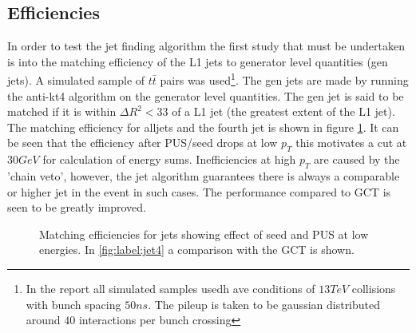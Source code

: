\subsection{Efficiencies}
In order to test the jet finding algorithm the first study that must be undertaken is into the matching efficiency of the L1 jets to generator level quantities (gen jets). A simulated sample of $t\bar{t}$ pairs was used\footnote{In the report all simulated samples usedh ave conditions of $13TeV$ collisions with bunch spacing $50ns$. The pileup is taken to be gaussian distributed around $40$ interactions per bunch crossing}. The gen jets are made by running the anti-kt4 algorithm on the generator level quantities. The gen jet is said to be matched if it is within ${\Delta R}^2<33$ of a L1 jet (the greatest extent of the L1 jet). The matching efficiency for alljets and the fourth jet is shown in figure \ref{match}. It can be seen that the efficiency after PUS/seed drops at low $p_T$ this motivates a cut at $30GeV$ for calculation of energy sums. Inefficiencies at high $p_T$ are caused by the 'chain veto', however, the jet algorithm guarantees there is always a comparable or higher jet in the event in such cases. The performance compared to GCT is seen to be greatly improved.  
\begin{figure}
\hfill
{}
\hfill
{}
\hfill
\caption{Matching efficiencies for jets showing effect of seed and PUS at low energies. In \ref{fig:label:jet4} a comparison with the GCT is shown.}
\label{match}
\end{figure}
